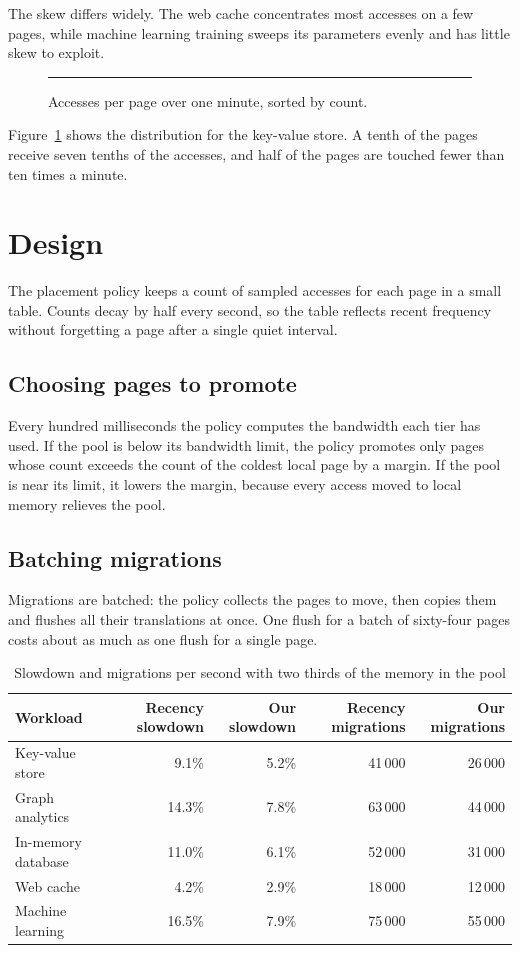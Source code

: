 \documentclass[sigconf,nonacm]{acmart}
\begin{document}
The skew differs widely. The web cache concentrates most accesses on a few pages, while machine
learning training sweeps its parameters evenly and has little skew to exploit.

\begin{figure}[t]
\centering
\rule{0.9\linewidth}{3cm}
\caption{Accesses per page over one minute, sorted by count.}
\label{fig:skew}
\end{figure}

Figure~\ref{fig:skew} shows the distribution for the key-value store. A tenth of the pages
receive seven tenths of the accesses, and half of the pages are touched fewer than ten times a
minute.

\section{Design}
The placement policy keeps a count of sampled accesses for each page in a small table. Counts
decay by half every second, so the table reflects recent frequency without forgetting a page
after a single quiet interval.

\subsection{Choosing pages to promote}
Every hundred milliseconds the policy computes the bandwidth each tier has used. If the pool is
below its bandwidth limit, the policy promotes only pages whose count exceeds the count of the
coldest local page by a margin. If the pool is near its limit, it lowers the margin, because
every access moved to local memory relieves the pool.

\subsection{Batching migrations}
Migrations are batched: the policy collects the pages to move, then copies them and flushes all
their translations at once. One flush for a batch of sixty-four pages costs about as much as one
flush for a single page.

\begin{table}[t]
\centering
\caption{Slowdown and migrations per second with two thirds of the memory in the pool}
\label{tab:results}
\begin{tabular}{lrrrr}
\toprule
Workload & Recency slowdown & Our slowdown & Recency migrations & Our migrations \\
\midrule
Key-value store & 9.1\% & 5.2\% & 41\,000 & 26\,000 \\
Graph analytics & 14.3\% & 7.8\% & 63\,000 & 44\,000 \\
In-memory database & 11.0\% & 6.1\% & 52\,000 & 31\,000 \\
Web cache & 4.2\% & 2.9\% & 18\,000 & 12\,000 \\
Machine learning & 16.5\% & 7.9\% & 75\,000 & 55\,000 \\
\bottomrule
\end{tabular}
\end{table}
\end{document}
